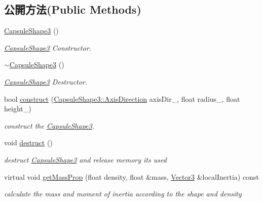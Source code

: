 \subsection*{公開方法(Public Methods)}
\begin{DoxyCompactItemize}
\item 
\hyperlink{class_magnum_1_1_capsule_shape3_a460283ca8b9d21b33e2288b4aa0cb7e7}{Capsule\+Shape3} ()
\begin{DoxyCompactList}\small\item\em \hyperlink{class_magnum_1_1_capsule_shape3}{Capsule\+Shape3} Constructor. \end{DoxyCompactList}\item 
\hyperlink{class_magnum_1_1_capsule_shape3_a6eda81a62f423445f8f57d7daf3278b7}{$\sim$\+Capsule\+Shape3} ()
\begin{DoxyCompactList}\small\item\em \hyperlink{class_magnum_1_1_capsule_shape3}{Capsule\+Shape3} Destructor. \end{DoxyCompactList}\item 
bool \hyperlink{class_magnum_1_1_capsule_shape3_aaa4eed50b454b4d54b2405b534ec0fca}{construct} (\hyperlink{class_magnum_1_1_capsule_shape3_a3dec6b2f3ea7c02e2c3db53d94652fca}{Capsule\+Shape3\+::\+Axis\+Direction} axis\+Dir\+\_\+, float radius\+\_\+, float height\+\_\+)
\begin{DoxyCompactList}\small\item\em construct the \hyperlink{class_magnum_1_1_capsule_shape3}{Capsule\+Shape3}. \end{DoxyCompactList}\item 
void \hyperlink{class_magnum_1_1_capsule_shape3_a38ec7d7403489738e55ddf21125f6bbc}{destruct} ()\hypertarget{class_magnum_1_1_capsule_shape3_a38ec7d7403489738e55ddf21125f6bbc}{}\label{class_magnum_1_1_capsule_shape3_a38ec7d7403489738e55ddf21125f6bbc}

\begin{DoxyCompactList}\small\item\em destruct \hyperlink{class_magnum_1_1_capsule_shape3}{Capsule\+Shape3} and release memory its used \end{DoxyCompactList}\item 
virtual void \hyperlink{class_magnum_1_1_capsule_shape3_a95ce60deb958461f0d7216819c56f798}{get\+Mass\+Prop} (float density, float \&mass, \hyperlink{class_magnum_1_1_vector3}{Vector3} \&local\+Inertia) const 
\begin{DoxyCompactList}\small\item\em calculate the mass and moment of inertia according to the shape and density \end{DoxyCompactList}\end{DoxyCompactItemize}
